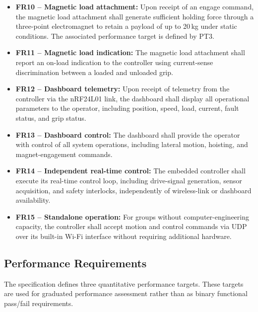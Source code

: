 \begin{itemize}
    \item \textbf{FR10 -- Magnetic load attachment:}
    Upon receipt of an engage command, the magnetic load
    attachment shall generate sufficient holding force
    through a three-point electromagnet to retain a payload
    of up to 20\,kg under static conditions. The associated
    performance target is defined by PT3.

    \item \textbf{FR11 -- Magnetic load indication:}
    The magnetic load attachment shall report an on-load
    indication to the controller using current-sense
    discrimination between a loaded and unloaded grip.

    \item \textbf{FR12 -- Dashboard telemetry:}
    Upon receipt of telemetry from the controller via the
    nRF24L01 link, the dashboard shall display all operational
    parameters to the operator, including position, speed,
    load, current, fault status, and grip status.

    \item \textbf{FR13 -- Dashboard control:}
    The dashboard shall provide the operator with control
    of all system operations, including lateral motion,
    hoisting, and magnet-engagement commands.

    \item \textbf{FR14 -- Independent real-time control:}
    The embedded controller shall execute its real-time
    control loop, including drive-signal generation, sensor
    acquisition, and safety interlocks, independently of
    wireless-link or dashboard availability.

    \item \textbf{FR15 -- Standalone operation:}
    For groups without computer-engineering capacity, the
    controller shall accept motion and control commands
    via UDP over its built-in Wi-Fi interface without
    requiring additional hardware.
\end{itemize}


\subsection{Performance Requirements}
\label{subsec:perf-req}

The specification defines three quantitative performance targets.
These targets are used for graduated performance assessment rather
than as binary functional pass/fail requirements.

